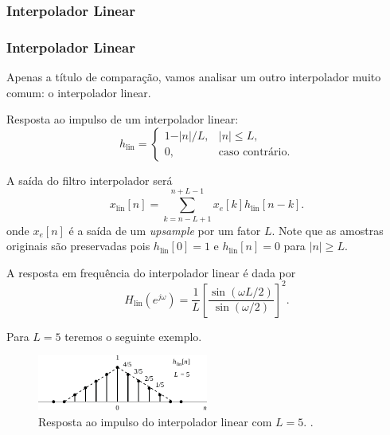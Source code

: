 \subsubsection{Interpolador Linear}
\begin{frame}[allowframebreaks]
  \frametitle{Interpolador Linear}

  Apenas a título de comparação, vamos analisar um outro interpolador muito comum: o interpolador linear.
  
  Resposta ao impulso de um interpolador linear:
  \begin{equation}
    h_{\text{lin}} = \begin{cases}
         1 - \vert n \vert / L, & \vert n \vert \leq L , \\
         0, &\text{caso contrário.}
                    \end{cases}
  \end{equation}

  A saída do filtro interpolador será
  \begin{equation}
   x_{\text{lin}} [n] = \sum_{k=n-L+1}^{n+L-1} x_e[k] h_{\text{lin}}[n-k] .
  \end{equation}
  onde $x_e[n]$ é a saída de um \textit{upsample} por um fator $L$.
  Note que as amostras originais são preservadas pois $h_{\text{lin}}[0] = 1$
  e $h_{\text{lin}}[n]=0$ para $|n| \geq L$.

  A resposta em frequência do interpolador linear é dada por
  \begin{equation}
   H_{\text{lin}} (e^{j\omega}) = \frac{1}{L} \left[ \frac{\sin (\omega L/2)}{\sin (\omega /2)} \right]^2 .
  \end{equation}


  \framebreak

  Para $L=5$ teremos o seguinte exemplo.
        \begin{figure}[h!]
        \centering
        \includegraphics[width=0.5\textwidth]{images/fig425.pdf}
        \caption{Resposta ao impulso do interpolador linear com $L=5$. \citep{oppenheim2009}.}
        \label{fig:fig425}
        \end{figure}


\end{frame}
